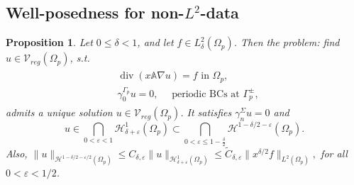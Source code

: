 \documentclass[report]{elsarticle}
\newtheorem{proposition}[theorem]{Proposition}
\numberwithin{theorem}{section}
\newcommand{\re}{\varepsilon}
\begin{document}
\subsection{Well-posedness for non-$L^2$-data}
\label{sec:wp_rough}
\begin{proposition}
	\label{prop:regularity2}
	Let $0\leq \delta<1$, and let $f\in L^2_{\delta}(\Omega_p)$. 
	Then the problem: find $u\in \mathcal{V}_{reg}(\Omega_p)$, s.t. 
	\begin{align}
		\label{eq:divxu}
		\begin{split}
		&\operatorname{div}(x\mathbb{A}\nabla u)=f \text{ in }\Omega_p,\\
		&\gamma_0^{\Gamma_p}u=0, \quad \text{ periodic BCs at }\Gamma_p^{\pm},
		\end{split}
	\end{align}
admits a unique solution $u\in \mathcal{V}_{reg}(\Omega_p)$. It satisfies $\gamma_n^{\Sigma}u=0$ and $$u\in \bigcap_{0<\re<1}\mathcal{H}^1_{\delta+\re}(\Omega_p)\subset \bigcap_{0<\re\leq 1-\frac{\delta}{2}}\mathcal{H}^{1-\delta/2-\re}(\Omega_p).$$
Also, $\|u\|_{\mathcal{H}^{1-\delta/2-\re/2}(\Omega_p)}\leq C_{\delta,\re} \|u\|_{\mathcal{H}^1_{\delta+\re}(\Omega_p)}\leq \tilde{C}_{\delta,\re} \|x^{\delta/2}f\|_{L^2(\Omega_p)},$ for all $0<\re<1/2$.   
\end{proposition}
\end{document}
